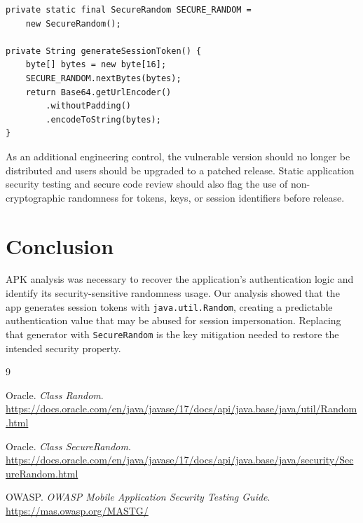 \documentclass[letterpaper,twocolumn,10pt]{article}
\begin{document}
\begin{verbatim}
private static final SecureRandom SECURE_RANDOM =
    new SecureRandom();

private String generateSessionToken() {
    byte[] bytes = new byte[16];
    SECURE_RANDOM.nextBytes(bytes);
    return Base64.getUrlEncoder()
        .withoutPadding()
        .encodeToString(bytes);
}
\end{verbatim}

As an additional engineering control, the vulnerable version should no longer be distributed and users should be upgraded to a patched release. Static application security testing and secure code review should also flag the use of non-cryptographic randomness for tokens, keys, or session identifiers before release.

\section{Conclusion}
APK analysis was necessary to recover the application's authentication logic and identify its security-sensitive randomness usage. Our analysis showed that the app generates session tokens with \texttt{java.util.Random}, creating a predictable authentication value that may be abused for session impersonation. Replacing that generator with \texttt{SecureRandom} is the key mitigation needed to restore the intended security property.

\begin{thebibliography}{9}

Oracle.
\newblock \textit{Class Random}.
\newblock \url{https://docs.oracle.com/en/java/javase/17/docs/api/java.base/java/util/Random.html}

Oracle.
\newblock \textit{Class SecureRandom}.
\newblock \url{https://docs.oracle.com/en/java/javase/17/docs/api/java.base/java/security/SecureRandom.html}

OWASP.
\newblock \textit{OWASP Mobile Application Security Testing Guide}.
\newblock \url{https://mas.owasp.org/MASTG/}

\end{thebibliography}
\end{document}
